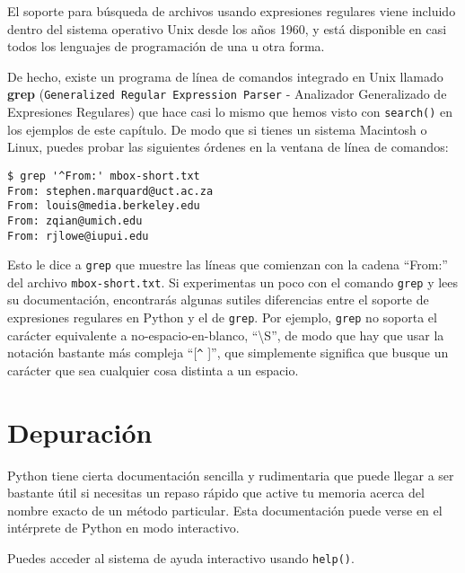 El soporte para búsqueda de archivos usando expresiones regulares viene incluido dentro del sistema operativo Unix
desde los años 1960, y está disponible en casi todos los lenguajes de programación de una u otra forma.

De hecho, existe un programa de línea de comandos integrado en Unix
llamado {\bf grep} ({\tt Generalized Regular Expression Parser} - Analizador Generalizado de Expresiones Regulares) que
hace casi lo mismo que hemos visto con {\tt search()} en los ejemplos de este capítulo. De modo que si tienes un
sistema Macintosh o Linux, puedes probar las siguientes órdenes en la ventana de línea de comandos:

\beforeverb
\begin{verbatim}
$ grep '^From:' mbox-short.txt
From: stephen.marquard@uct.ac.za
From: louis@media.berkeley.edu
From: zqian@umich.edu
From: rjlowe@iupui.edu
\end{verbatim}
\afterverb
%
Esto le dice a {\tt grep} que muestre las líneas que comienzan con la cadena ``From:'' del archivo
{\tt mbox-short.txt}. Si experimentas un poco con el comando {\tt grep} y lees su documentación,
encontrarás algunas sutiles diferencias entre el soporte de expresiones regulares en Python y el
de {\tt grep}. Por ejemplo, {\tt grep} no soporta el carácter equivalente a no-espacio-en-blanco,
``{\textbackslash}S'', de modo que hay que usar la notación bastante más compleja ``[\verb"^" ]'',
que simplemente significa que busque un carácter que sea cualquier cosa distinta a un espacio.

\section{Depuración}

Python tiene cierta documentación sencilla y rudimentaria que puede llegar a ser bastante útil si
necesitas un repaso rápido que active tu memoria acerca del nombre exacto de un método particular.
Esta documentación puede verse en el intérprete de Python en modo interactivo.

Puedes acceder al sistema de ayuda interactivo usando {\tt help()}.

